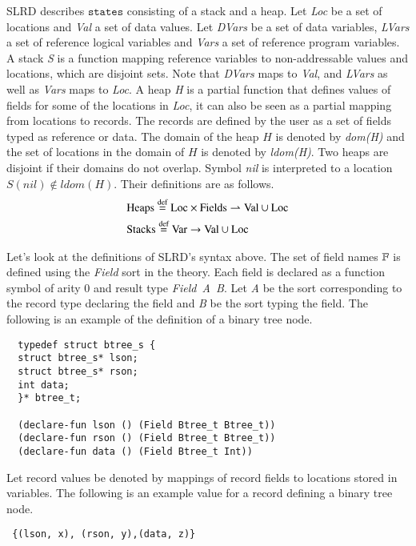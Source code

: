 \documentclass{article}
\theoremstyle{plain}
\begin{document}
SLRD describes $\mathtt{states}$ consisting of a stack and a heap. 
Let \textit{Loc} be a set of locations and \textit{Val} a set of data values.
Let \textit{DVars} be a set of data variables, \textit{LVars} a set of reference logical variables and \textit{Vars} a set of reference program variables.
A stack \textit{S} is a function mapping reference variables to non-addressable values and locations, which are disjoint sets. 
Note that \textit{DVars} maps to \textit{Val}, and \textit{LVars} as well as \textit{Vars} maps to \textit{Loc}.
A heap \textit{H} is a partial function that defines values of fields for some of the locations in \textit{Loc}, it can also be seen as a partial mapping from locations to records. 
The records are defined by the user as a set of fields typed as reference or data. 
The domain of the heap $H$ is denoted by \textit{dom(H)} and the set of locations in the domain of $H$ is denoted by \textit{ldom(H)}. 
Two heaps are disjoint if their domains do not overlap. Symbol \textit{nil} is interpreted to a location $\mathit{S(nil) \notin ldom(H)}$. 
Their definitions are as follows.
\begin{equation*}
\begin{split}
& \mathrm{Heaps \buildrel \text{d{}ef}\over= Loc \times Fields \rightharpoonup Val\cup Loc} \\
& \mathrm{Stacks \buildrel \text{d{}ef}\over= Var \to Val \cup Loc}
\end{split}
\end{equation*}


Let's look at the definitions of SLRD's syntax above. The set of field names $\mathbb{F}$ is defined using the \textit{Field} sort in the theory. 
Each field is declared as a function symbol of arity 0 and result type \textit{Field\ A\ B}. 
Let \textit{A} be the sort corresponding to the record type declaring the field and \textit{B} be the sort typing the field. 
The following is an example of the definition of a binary tree node.
\begin{verbatim}
  typedef struct btree_s {
  struct btree_s* lson;
  struct btree_s* rson;
  int data;
  }* btree_t;
  
  (declare-fun lson () (Field Btree_t Btree_t))
  (declare-fun rson () (Field Btree_t Btree_t))
  (declare-fun data () (Field Btree_t Int))
\end{verbatim}

Let record values be denoted by mappings of record fields to locations stored in variables. 
The following is an example value for a record defining a binary tree node.
\begin{verbatim}
 {(lson, x), (rson, y),(data, z)}
\end{verbatim}
\end{document}
